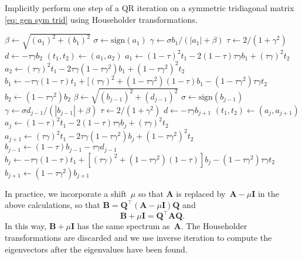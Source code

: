 \documentclass[12pt,a4paper]{article}
\newcommand{\bs}[1]{\boldsymbol{#1}}
\newcommand{\sign}{\mathrm{sign}}
\begin{document}
\begin{algorithm}
\caption{Implicitly perform one step of a QR iteration on a symmetric
tridiagonal matrix \eqref{eq: gen sym trid} using Householder transformations.}
\begin{algorithmic}
\Function{implicit\_Q\_step}{$\bs{a}$, $\bs{b}$} 
\State $\beta\gets\sqrt{(a_1)^2+(b_1)^2}$
\State $\sigma\gets\sign(a_1)$
\State $\gamma\gets\sigma b_1/(|a_1|+\beta)$
\State $\tau\gets 2/(1+\gamma^2)$
\State $d\gets-\tau\gamma b_2$
\State $(t_1,t_2)\gets(a_1,a_2)$
\State $a_1\gets(1-\tau)^2t_1-2(1-\tau)\tau\gamma b_1+(\tau\gamma)^2t_2$
\State $a_2\gets(\tau\gamma)^2t_1-2\tau\gamma(1-\tau\gamma^2)b_1
+(1-\tau\gamma^2)^2t_2$
\State $b_1\gets-\tau\gamma(1-\tau)t_1
+[(\tau\gamma)^2+(1-\tau\gamma^2)(1-\tau)b_1-(1-\tau\gamma^2)\tau\gamma t_2$
\State $b_2\gets(1-\tau\gamma^2)b_2$
    \State $\beta\gets\sqrt{(b_{j-1})^2+(d_{j-1})^2}$
    \State $\sigma\gets\sign(b_{j-1})$
    \State $\gamma\gets\sigma d_{j-1}/(|b_{j-1}|+\beta)$
    \State $\tau\gets 2/(1+\gamma^2)$
    \State $d\gets-\tau\gamma b_{j+1}$
    \State $(t_1,t_2)\gets(a_j,a_{j+1})$
    \State $a_j\gets(1-\tau)^2t_1-2(1-\tau)\tau\gamma b_j+(\tau\gamma)^2t_2$
    \State $a_{j+1}\gets(\tau\gamma)^2t_1-2\tau\gamma(1-\tau\gamma^2)b_j
+(1-\tau\gamma^2)^2t_2$
    \State $b_{j-1}\gets(1-\tau)b_{j-1}-\tau\gamma d_{j-1}$
    \State $b_j\gets-\tau\gamma(1-\tau)t_1
+[(\tau\gamma)^2+(1-\tau\gamma^2)(1-\tau)]b_j-(1-\tau\gamma^2)\tau\gamma t_2$
    \State $b_{j+1}\gets(1-\tau\gamma^2)b_{j+1}$
\EndFor
\EndFunction
\end{algorithmic}
\end{algorithm}

In practice, we incorporate a shift~$\mu$ so that $\bs{A}$ is replaced
by~$\bs{A}-\mu\bs{I}$ in the above calculations, so that 
$\bs{B}=\bs{Q}^\top(\bs{A}-\mu\bs{I})\bs{Q}$ and
\[
\bs{B}+\mu\bs{I}=\bs{Q}^\top\bs{A}\bs{Q}.
\]
In this way, $\bs{B}+\mu\bs{I}$ has the same spectrum as~$\bs{A}$.  The 
Householder transformations are discarded and we use inverse iteration to 
compute the eigenvectors after the eigenvalues have been found.
\end{document}
